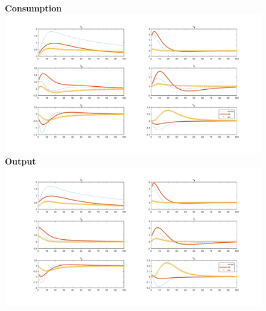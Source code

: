 \documentclass[12pt,reqno]{article}
\numberwithin{equation}{section}
\begin{document}
\begin{figure}[H]
\textbf{Consumption}\\
\includegraphics[scale=0.4]{MSV_impresp_cons.pdf}\\
\textbf{Output}\\
\includegraphics[scale=0.4]{MSV_impresp_output.pdf}\\
\end{figure}
\end{document}
